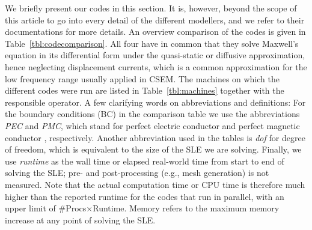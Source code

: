 \documentclass[extra, camera,%
]{gji}
\begin{document}
We briefly present our codes in this section. It is, however, beyond the scope of this article to go into every detail of the different modellers, and we refer to their documentations for more details. An overview comparison of the codes is given in Table~\ref{tbl:codecomparison}. All four have in common that they solve Maxwell's equation in its differential form  under the quasi-static or diffusive approximation, hence neglecting displacement currents, which is a common approximation for the low frequency range usually applied in CSEM.  The machines on which the different codes were run are listed in Table~\ref{tbl:machines} together with the responsible operator. A few clarifying words on abbreviations and definitions: For the boundary conditions (BC) in the comparison table we use the abbreviations \emph{PEC} and \emph{PMC}, which stand for perfect electric conductor
and perfect magnetic conductor%
, respectively.  Another abbreviation used in the tables is \emph{dof} for degree of freedom, which is equivalent to the size of the SLE we are solving. Finally, we use \emph{runtime} as the wall time or elapsed real-world time from start to end of solving the SLE; pre- and post-processing (e.g., mesh generation) is not measured. Note that the actual computation time or CPU time is therefore much higher than the reported runtime for the codes that run in parallel, with an upper limit of \#Procs$\times$Runtime. Memory refers to the maximum memory increase at any point of solving the SLE.
\end{document}
